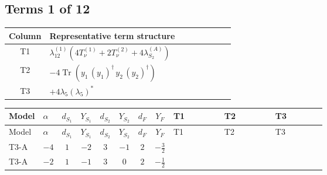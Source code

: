 \documentclass[8pt]{article}
\begin{document}
\begin{landscape}
\subsection*{Terms 1 of 12}
\begin{center}
\begin{tabular}{@{}c >{\raggedright\arraybackslash}p{0.82\linewidth}@{}}
\toprule
Column & Representative term structure \\
\midrule
T1 & \(\displaystyle {\lambda_{12}^{(1)}} (4 T_{\nu}^{(1)}+2 T_{\nu}^{(2)}+4 {\lambda_{S_2}^{(A)}})\) \\
\midrule
T2 & \(\displaystyle -4 \operatorname{Tr}\!\left({y_1}\,\left({y_1}\right)^{\dagger}\,{y_2}\,\left({y_2}\right)^{\dagger}\right)\) \\
\midrule
T3 & \(\displaystyle +4 {\lambda_5} \left({\lambda_5}\right)^{*}\) \\
\midrule
\bottomrule
\end{tabular}
\end{center}
\smallskip
\tiny
\begin{longtable}{@{}llcccccc >{\raggedright\arraybackslash}p{0.21\linewidth} >{\raggedright\arraybackslash}p{0.21\linewidth} >{\raggedright\arraybackslash}p{0.21\linewidth}@{}}
\toprule
Model & $\alpha$ & $d_{S_1}$ & $Y_{S_1}$ & $d_{S_2}$ & $Y_{S_2}$ & $d_F$ & $Y_F$ & T1 & T2 & T3 \\
\midrule
\endfirsthead
\toprule
Model & $\alpha$ & $d_{S_1}$ & $Y_{S_1}$ & $d_{S_2}$ & $Y_{S_2}$ & $d_F$ & $Y_F$ & T1 & T2 & T3 \\
\midrule
\endhead
T3-A & $-4$ & $1$ & $-2$ & $3$ & $-1$ & $2$ & $-\frac{3}{2}$ & \scriptsize\adjustbox{max width=\linewidth}{$\begin{gathered} {\lambda_{12}^{(1)}} (4 T_{\nu}^{(1)}+2 T_{\nu}^{(2)}+4 {\lambda_{S_2}^{(A)}})\end{gathered}$} & \scriptsize\adjustbox{max width=\linewidth}{$\begin{gathered} -4 \operatorname{Tr}\!\left({y_1}\,\left({y_1}\right)^{\dagger}\,{y_2}\,\left({y_2}\right)^{\dagger}\right)\end{gathered}$} & \scriptsize\adjustbox{max width=\linewidth}{$\begin{gathered} +4 {\lambda_5} \left({\lambda_5}\right)^{*}\end{gathered}$} \\
\midrule
T3-A & $-2$ & $1$ & $-1$ & $3$ & $0$ & $2$ & $-\frac{1}{2}$ & \scriptsize\adjustbox{max width=\linewidth}{$\begin{gathered} {\lambda_{12}^{(1)}} (4 T_{\nu}^{(1)}+2 T_{\nu}^{(2)}+4 {\lambda_{S_2}^{(A)}})\end{gathered}$} & \scriptsize\adjustbox{max width=\linewidth}{$\begin{gathered} -4 \operatorname{Tr}\!\left({y_1}\,\left({y_1}\right)^{\dagger}\,{y_2}\,\left({y_2}\right)^{\dagger}\right)\end{gathered}$} & \scriptsize\adjustbox{max width=\linewidth}{$\begin{gathered} +4 {\lambda_5} \left({\lambda_5}\right)^{*}\end{gathered}$} \\

\end{longtable}
\end{landscape}
\end{document}
